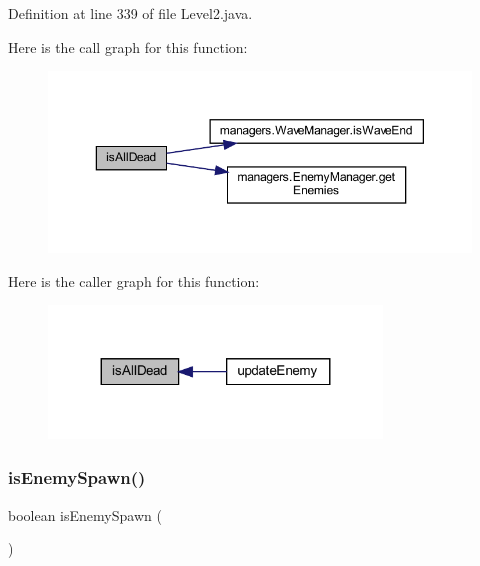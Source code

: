 Definition at line 339 of file Level2.\+java.

Here is the call graph for this function\+:
\nopagebreak
\begin{figure}[H]
\begin{center}
\leavevmode
\includegraphics[width=350pt]{classscenes_1_1_level2_acd1846d50c3d8678777f9ab6716f5cf3_cgraph}
\end{center}
\end{figure}
Here is the caller graph for this function\+:\nopagebreak
\begin{figure}[H]
\begin{center}
\leavevmode
\includegraphics[width=251pt]{classscenes_1_1_level2_acd1846d50c3d8678777f9ab6716f5cf3_icgraph}
\end{center}
\end{figure}
\mbox{\label{classscenes_1_1_level2_a121827ebd1c5b24c92f966721b51c0b9}} 
\subsubsection{\texorpdfstring{is\+Enemy\+Spawn()}{isEnemySpawn()}}
{\footnotesize\ttfamily boolean is\+Enemy\+Spawn (\begin{DoxyParamCaption}{ }\end{DoxyParamCaption})\hspace{0.3cm}{\ttfamily [private]}}



